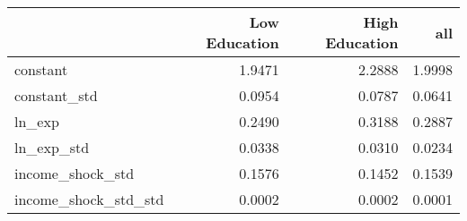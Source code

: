 \begin{tabular}{lrrr}
\toprule
 & Low Education & High Education & all \\
\midrule
constant & 1.9471 & 2.2888 & 1.9998 \\
constant_std & 0.0954 & 0.0787 & 0.0641 \\
ln_exp & 0.2490 & 0.3188 & 0.2887 \\
ln_exp_std & 0.0338 & 0.0310 & 0.0234 \\
income_shock_std & 0.1576 & 0.1452 & 0.1539 \\
income_shock_std_std & 0.0002 & 0.0002 & 0.0001 \\
\bottomrule
\end{tabular}
